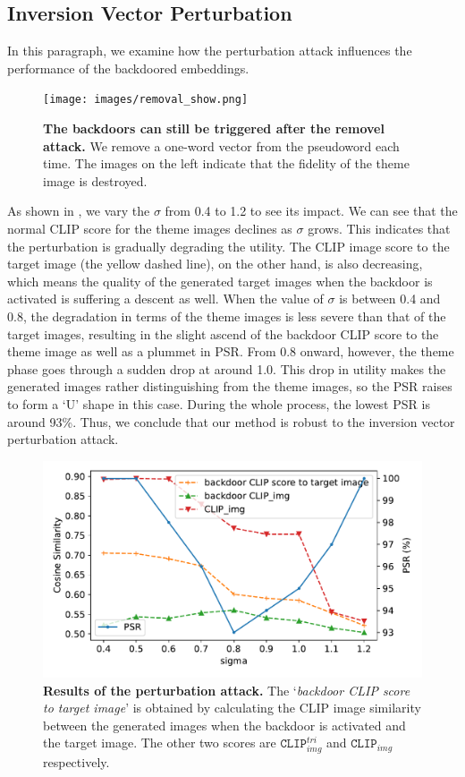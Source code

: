 \subsection{Inversion Vector Perturbation}
In this paragraph, we examine how the perturbation attack influences the performance of the backdoored embeddings.
\begin{figure}
    \centering 
    \texttt{[image: images/removal\_show.png]}
    \caption{\textbf{The backdoors can still be triggered after the removel attack.} We remove a one-word vector from the pseudoword each time. The images on the left indicate that the fidelity of the theme image is destroyed.}
    \label{fig:removal_target_image}
    \vspace{-1em}
\end{figure}
As shown in , we vary the $\sigma$ from 0.4 to 1.2 to see its impact. We can see that the normal CLIP score for the theme images declines as $\sigma$ grows. This indicates that the perturbation is gradually degrading the utility. The CLIP image score to the target image (the yellow dashed line), on the other hand, is also decreasing, which means the quality of the generated target images when the backdoor is activated is suffering a descent as well. When the value of $\sigma$ is between 0.4 and 0.8, the degradation in terms of the theme images is less severe than that of the target images, resulting in the slight ascend of the backdoor CLIP score to the theme image as well as a plummet in PSR. From 0.8 onward, however, the theme phase goes through a sudden drop at around 1.0. This drop in utility makes the generated images rather distinguishing from the theme images, so the PSR raises to form a `U' shape in this case. During the whole process, the lowest PSR is around 93\%. Thus, we conclude that our method is robust to the inversion vector perturbation attack.

\begin{figure}
    \centering 
    \includegraphics[width=0.95\linewidth]{images/PSR_perturb_inversion.pdf}
    \caption{\textbf{Results of the perturbation attack.} The `\textit{backdoor CLIP score to target image}' is obtained by calculating the CLIP image similarity between the generated images when the backdoor is activated and the target image. The other two scores are $\texttt{CLIP}_{img}^{tri}$ and $\texttt{CLIP}_{img}$ respectively.}
    \label{fig:perturb_pseudo}
\end{figure}

